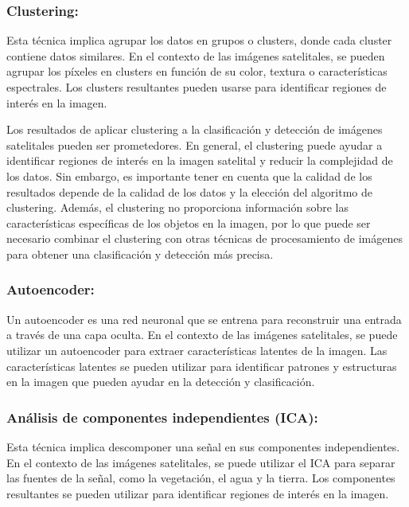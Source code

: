 \documentclass[article]{llncs}
\begin{document}
\subsubsection{Clustering:} Esta técnica implica agrupar los datos en grupos o clusters, donde cada cluster contiene datos similares. 
En el contexto de las imágenes satelitales, se pueden agrupar los píxeles en clusters en función de su color, textura o 
características espectrales. Los clusters resultantes pueden usarse para identificar regiones de interés en la imagen.

Los resultados de aplicar clustering a la clasificación y detección de imágenes satelitales pueden ser prometedores. 
En general, el clustering puede ayudar a identificar regiones de interés en la imagen satelital y reducir la complejidad 
de los datos. Sin embargo, es importante tener en cuenta que la calidad de los resultados depende de la calidad de los 
datos y la elección del algoritmo de clustering. Además, el clustering no proporciona información sobre las 
características específicas de los objetos en la imagen, por lo que puede ser necesario combinar el clustering con otras 
técnicas de procesamiento de imágenes para obtener una clasificación y detección más precisa.

\subsubsection{Autoencoder:} Un autoencoder es una red neuronal que se entrena para reconstruir una entrada a través de 
una capa oculta. En el contexto de las imágenes satelitales, se puede utilizar un autoencoder para extraer 
características latentes de la imagen. Las características latentes se pueden utilizar para identificar patrones y 
estructuras en la imagen que pueden ayudar en la detección y clasificación.

\subsubsection{Análisis de componentes independientes (ICA):}Esta técnica implica descomponer una señal en sus 
componentes independientes. En el contexto de las imágenes satelitales, se puede utilizar el ICA para separar las 
fuentes de la señal, como la vegetación, el agua y la tierra. Los componentes resultantes se pueden utilizar para 
identificar regiones de interés en la imagen.
\end{document}
